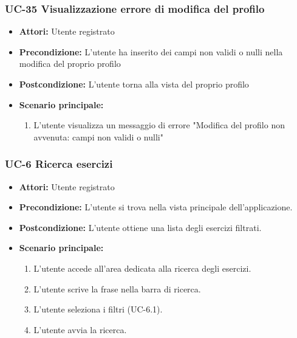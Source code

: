 \subsubsection{UC-35 Visualizzazione errore di modifica del profilo}	
	\begin{itemize}
		\item \textbf{Attori:} Utente registrato
		\item \textbf{Precondizione:} L'utente ha inserito dei campi non validi o nulli nella modifica del proprio profilo
		\item \textbf{Postcondizione:} L'utente torna alla vista del proprio profilo
		\item \textbf{Scenario principale:}
		\begin{enumerate}
			\item L'utente visualizza un messaggio di errore "Modifica del profilo non avvenuta: campi non validi o nulli"
		\end{enumerate}
	\end{itemize}
	
\subsubsection{UC-6 Ricerca esercizi}
		\begin{itemize}
			\item\textbf{ Attori:} Utente registrato
			\item \textbf{Precondizione:} L'utente si trova nella vista principale dell'applicazione.
			\item \textbf{Postcondizione:} L'utente ottiene una lista degli esercizi filtrati.
			\item \textbf{Scenario principale:}
				\begin{enumerate}
					\item L'utente accede all'area dedicata alla ricerca degli esercizi.
					\item L'utente scrive la frase nella barra di ricerca.
					\item L'utente seleziona i filtri (UC-6.1).
					\item L'utente avvia la ricerca.
				\end{enumerate}
		\end{itemize}

